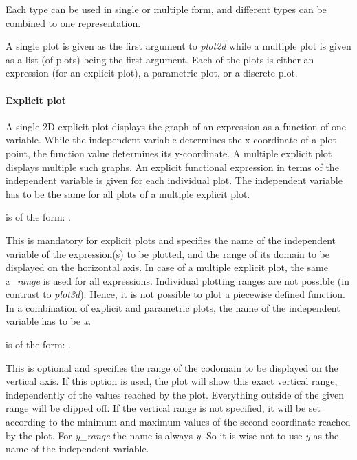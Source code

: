 \documentclass[../Maxima_Workbook.tex]{subfiles}
\begin{document}
\lz Each type can be used in single or multiple form, and different types can be combined to one representation.

\lzz {}

\lz A single plot is given as the first argument to \emph{plot2d} while a multiple plot is given as a list (of plots) being the first argument. Each of the plots is either an expression (for an explicit plot), a parametric plot, or a discrete plot.

\paragraph{Explicit plot} \mbox{}

\lz A single 2D explicit plot displays the graph of an expression as a function of one variable. While the independent variable determines the x-coordinate of a plot point, the function value determines its y-coordinate. A multiple explicit plot displays multiple such graphs. An explicit functional expression in terms of the independent variable is given for each individual plot. The independent variable has to be the same for all plots of a multiple explicit plot.

\lzz {} is of the form: . 

\lz This is mandatory for explicit plots and specifies the name of the independent variable of the expression(s) to be plotted, and the range of its domain to be displayed on the horizontal axis. In case of a multiple explicit plot, the same \emph{x\_range} is used for all expressions. Individual plotting ranges are not possible (in contrast to \emph{plot3d}). Hence, it is not possible to plot a piecewise defined function. In a combination of explicit and parametric plots, the name of the independent variable has to be \emph{x}.

\lzz {} is of the form: . 

\lz This is optional and specifies the range of the codomain to be displayed on the vertical axis. If this option is used, the plot will show this exact vertical range, independently of the values reached by the plot. Everything outside of the given range will be clipped off. If the vertical range is not specified, it will be set according to the minimum and maximum values of the second coordinate reached by the plot. For \emph{y\_range} the name is always \emph{y}. So it is wise not to use \emph{y} as the name of the independent variable. 
\end{document}

